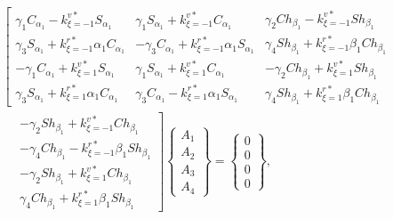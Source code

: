 \documentclass[preprint,12pt]{elsarticle}
\begin{document}
\begin{equation}\label{eq:ABx}
	\begin{split}
		&\left[ \begin{array}{c}
			\gamma_1 C_{\alpha_1} - k^{v*}_{\xi=-1} S_{\alpha_1} \\ 
			\gamma_3 S_{\alpha_1} + k^{r*}_{\xi=-1} \alpha_1 C_{\alpha_1} \\ 
			-\gamma_1 C_{\alpha_1} + k^{v*}_{\xi=1} S_{\alpha_1} \\ 
			\gamma_3 S_{\alpha_1} + k^{r*}_{\xi=1} \alpha_1 C_{\alpha_1}
		\end{array} 
		\begin{array}{c}
			\gamma_1 S_{\alpha_1} + k^{v*}_{\xi=-1} C_{\alpha_1} \\ 
			-\gamma_3 C_{\alpha_1} + k^{r*}_{\xi=-1} \alpha_1 S_{\alpha_1} \\ 
			\gamma_1 S_{\alpha_1} + k^{v*}_{\xi=1} C_{\alpha_1} \\ 
			\gamma_3 C_{\alpha_1} - k^{r*}_{\xi=1} \alpha_1 S_{\alpha_1}
		\end{array} 
		\begin{array}{c}
			\gamma_2 Ch_{\beta_1} - k^{v*}_{\xi=-1} Sh_{\beta_1} \\ 
			\gamma_4 Sh_{\beta_1} + k^{r*}_{\xi=-1} \beta_1 Ch_{\beta_1} \\ 
			-\gamma_2 Ch_{\beta_1} + k^{v*}_{\xi=1} Sh_{\beta_1} \\ 
			\gamma_4 Sh_{\beta_1} + k^{r*}_{\xi=1} \beta_1 Ch_{\beta_1}
		\end{array} \right. \\ 
		&\quad
		\left. \begin{array}{c}
			-\gamma_2 Sh_{\beta_1} + k^{v*}_{\xi=-1} Ch_{\beta_1} \\ 
			-\gamma_4 Ch_{\beta_1} - k^{r*}_{\xi=-1} \beta_1 Sh_{\beta_1} \\ 
			-\gamma_2 Sh_{\beta_1} + k^{v*}_{\xi=1} Ch_{\beta_1} \\ 
			\gamma_4 Ch_{\beta_1} + k^{r*}_{\xi=1} \beta_1 Sh_{\beta_1}
		\end{array} \right] \begin{Bmatrix}
			A_1 \\ A_2 \\ A_3 \\ A_4
		\end{Bmatrix} =  \begin{Bmatrix}
			0 \\ 0 \\ 0 \\ 0
		\end{Bmatrix},
	\end{split}
\end{equation}
\end{document}

